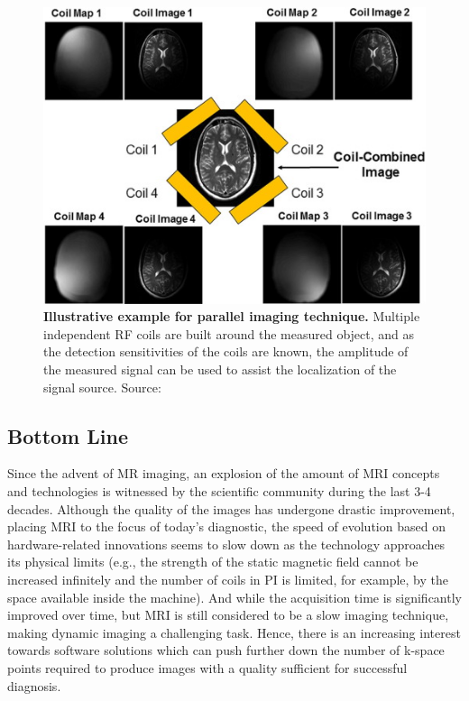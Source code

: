\begin{figure}[htb]
    \centering
    \includegraphics[width=0.8\linewidth]{images/parallel_imaging.jpg}
    \caption{\textbf{Illustrative example for parallel imaging technique.} Multiple independent RF coils are built around the measured object, and as the detection sensitivities of the coils are known, the amplitude of the measured signal can be used to assist the localization of the signal source. Source:~\cite{hamilton_recent_2017}}
    \label{fig:parallel_imaging}
\end{figure}

\subsection{Bottom Line}
Since the advent of MR imaging, an explosion of the amount of MRI concepts and technologies is witnessed by the scientific community during the last 3-4 decades. Although the quality of the images has undergone drastic improvement, placing MRI to the focus of today's diagnostic, the speed of evolution based on hardware-related innovations seems to slow down as the technology approaches its physical limits (e.g., the strength of the static magnetic field cannot be increased infinitely and the number of coils in PI is limited, for example, by the space available inside the machine). And while the acquisition time is significantly improved over time, but MRI is still considered to be a slow imaging technique, making dynamic imaging a challenging task. Hence, there is an increasing interest towards software solutions which can push further down the number of k-space points required to produce images with a quality sufficient for successful diagnosis.

\clearpage